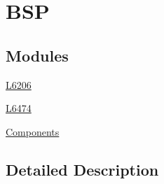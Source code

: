 \hypertarget{group___b_s_p}{}\section{B\+SP}
\label{group___b_s_p}
\subsection*{Modules}
\begin{DoxyCompactItemize}
\item 
\mbox{\hyperlink{group___l6206}{L6206}}
\item 
\mbox{\hyperlink{group___l6474}{L6474}}
\item 
\mbox{\hyperlink{group___components}{Components}}
\end{DoxyCompactItemize}


\subsection{Detailed Description}

